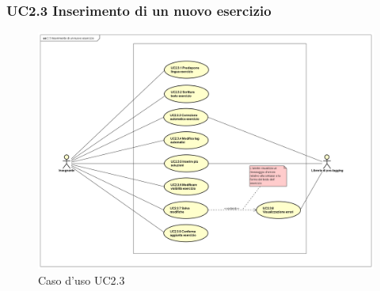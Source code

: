 




\subsubsection{UC2.3 Inserimento di un nuovo esercizio}

\begin{figure}[H]
	\centering
	\includegraphics[width=18cm]{img/UC23.png} 
	\caption{Caso d'uso UC2.3}
\end{figure}

